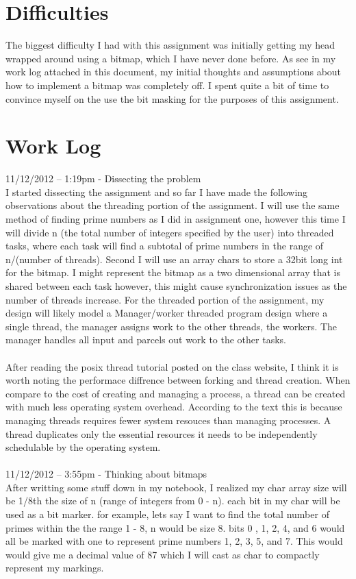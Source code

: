 \documentclass[12pt,letterpaper]{article}
\begin{document}
\section{Difficulties}
The biggest difficulty I had with this assignment was initially getting my head wrapped around using a bitmap, which I have never done before. As see in my work log attached in this document, my initial thoughts and assumptions about how to implement a bitmap was completely off. I spent quite a bit of time to convince myself on the use the bit masking for the purposes of this assignment.
\\
\section{Work Log}
11/12/2012 – 1:19pm - Dissecting the problem\\
I started dissecting the assignment and so far I have made the following observations about the threading portion of the assignment. I will use the same method of finding prime numbers as I did in assignment one, however this time I will divide n (the total number of integers specified by the user) into threaded tasks, where each task will find a subtotal of prime numbers in the range of n/(number of threads). Second I will use an array chars to store a 32bit long int for the bitmap. I might represent the bitmap as a two dimensional array that is shared between each task however, this might cause synchronization issues as the number of threads increase. For the threaded portion of the assignment, my design will likely model a Manager/worker threaded program design where a single thread, the manager assigns work to the other threads, the workers. The manager handles all input and parcels out work to the other tasks.
\\\\
After reading the posix thread tutorial posted on the class website, I think it is worth noting the performace diffrence between forking and thread creation. When compare to the cost of creating and managing a process, a thread can be created with much less operating system overhead. According to the text this is because managing threads requires fewer system resouces than managing processes. A thread duplicates only the essential resources it needs to be independently schedulable by the operating system.
\\\\
11/12/2012 – 3:55pm - Thinking about bitmaps\\
After writting some stuff down in my notebook, I realized my char array size will be 1/8th the size of n (range of integers from 0 - n). each bit in my char will be used as a bit marker. for example, lets say I want to find the total number of primes within the the range 1 - 8, n would be size 8. bits 0 , 1, 2, 4, and 6 would all be marked with one to represent prime numbers 1, 2, 3, 5, and 7. This would would give me a decimal value of 87 which I will cast as char to compactly represent my markings. 
\end{document}
